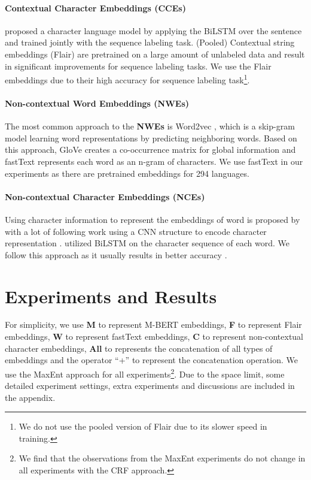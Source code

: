 \documentclass[11pt,a4paper]{article}
\begin{document}
\paragraph{Contextual Character Embeddings (CCEs)} 
\citet{liu2018empower} proposed a character language model by applying the BiLSTM over the sentence and trained jointly with the sequence labeling task. (Pooled) Contextual string embeddings (Flair) \cite{akbik-etal-2018-contextual,akbik-etal-2019-pooled} are pretrained on a large amount of unlabeled data and result in significant improvements for sequence labeling tasks. We use the Flair embeddings due to their high accuracy for sequence labeling task\footnote{We do not use the pooled version of Flair due to its slower speed in training.}.


\paragraph{Non-contextual Word Embeddings (NWEs)} The most common approach to the \textbf{NWEs} is Word2vec \cite{mikolov2013distributed}, which is a skip-gram model learning word representations by predicting neighboring words. Based on this approach, GloVe \cite{pennington2014glove} creates a co-occurrence matrix for global information and fastText \cite{bojanowski2017enriching} represents each word as an n-gram of characters. We use fastText in our experiments as there are pretrained embeddings for 294 languages.

\paragraph{Non-contextual Character Embeddings (NCEs)} 
Using character information to represent the embeddings of word is proposed by \citet{santos2014learning} with a lot of following work using a CNN structure to encode character representation \cite{dos-santos-guimaraes-2015-boosting,chiu-nichols-2016-named,ma-hovy-2016-end}. \citet{lample-etal-2016-neural} utilized BiLSTM on the character sequence of each word. We follow this approach as it usually results in better accuracy \cite{yang-etal-2018-design}.


\section{Experiments and Results}
For simplicity, we use \textbf{M} to represent M-BERT embeddings, \textbf{F} to represent Flair embeddings, \textbf{W} to represent fastText embeddings, \textbf{C} to represent non-contextual character embeddings, \textbf{All} to represents the concatenation of all types of embeddings and the operator ``+'' to represent the concatenation operation. We use the MaxEnt approach for all experiments\footnote{We find that the observations from the MaxEnt experiments do not change in all experiments with the CRF approach.}. Due to the space limit, some detailed experiment settings, extra experiments and discussions are included in the appendix. 
\end{document}
